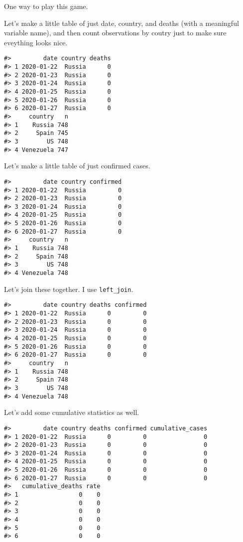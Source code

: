 \documentclass[
]{book}
\begin{document}
One way to play this game.

Let's make a little table of just date, country, and deaths (with a meaningful variable name), and then count observations by coutry just to make sure eveything looks nice.

\begin{verbatim}
#>         date country deaths
#> 1 2020-01-22  Russia      0
#> 2 2020-01-23  Russia      0
#> 3 2020-01-24  Russia      0
#> 4 2020-01-25  Russia      0
#> 5 2020-01-26  Russia      0
#> 6 2020-01-27  Russia      0
#>     country   n
#> 1    Russia 748
#> 2     Spain 745
#> 3        US 748
#> 4 Venezuela 747
\end{verbatim}

Let's make a little table of just confirmed cases.

\begin{verbatim}
#>         date country confirmed
#> 1 2020-01-22  Russia         0
#> 2 2020-01-23  Russia         0
#> 3 2020-01-24  Russia         0
#> 4 2020-01-25  Russia         0
#> 5 2020-01-26  Russia         0
#> 6 2020-01-27  Russia         0
#>     country   n
#> 1    Russia 748
#> 2     Spain 748
#> 3        US 748
#> 4 Venezuela 748
\end{verbatim}

Let's join these together. I use \texttt{left\_join}.

\begin{verbatim}
#>         date country deaths confirmed
#> 1 2020-01-22  Russia      0         0
#> 2 2020-01-23  Russia      0         0
#> 3 2020-01-24  Russia      0         0
#> 4 2020-01-25  Russia      0         0
#> 5 2020-01-26  Russia      0         0
#> 6 2020-01-27  Russia      0         0
#>     country   n
#> 1    Russia 748
#> 2     Spain 748
#> 3        US 748
#> 4 Venezuela 748
\end{verbatim}

Let's add some cumulative statistics as well.

\begin{verbatim}
#>         date country deaths confirmed cumulative_cases
#> 1 2020-01-22  Russia      0         0                0
#> 2 2020-01-23  Russia      0         0                0
#> 3 2020-01-24  Russia      0         0                0
#> 4 2020-01-25  Russia      0         0                0
#> 5 2020-01-26  Russia      0         0                0
#> 6 2020-01-27  Russia      0         0                0
#>   cumulative_deaths rate
#> 1                 0    0
#> 2                 0    0
#> 3                 0    0
#> 4                 0    0
#> 5                 0    0
#> 6                 0    0
\end{verbatim}
\end{document}
